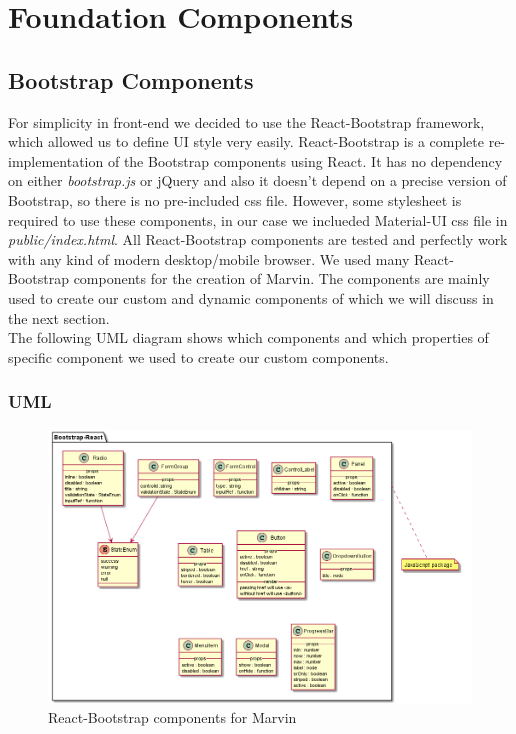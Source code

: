 \section{Foundation Components}

	\subsection{Bootstrap Components} For simplicity in front-end we decided to use the React-Bootstrap framework, which allowed us to define UI style very easily. React-Bootstrap is a complete re-implementation of the Bootstrap components using React. It has no dependency on either \textit{bootstrap.js}  or jQuery and also it doesn't depend on a precise version of Bootstrap, so there is no pre-included css file. However, some stylesheet is required to use these components, in our case we inclueded Material-UI css file in \textit{public/index.html}. All React-Bootstrap components are tested and perfectly work with any kind of modern desktop/mobile browser. We used many React-Bootstrap components for the creation of Marvin. The components are mainly used to create our custom and dynamic components 
	of which we will discuss in the next section. \\ The following UML diagram shows which components and which properties of specific component we used to create our custom components. 

		\subsubsection{UML}
		\begin{figure}[h]
			\centering
			\includegraphics[width=1\linewidth]{"diagrammi/bootstrap"}
			\caption{React-Bootstrap components for Marvin}
			\label{fig:React-Bootstrap components for Marvin}
		\end{figure}
	\newpage
